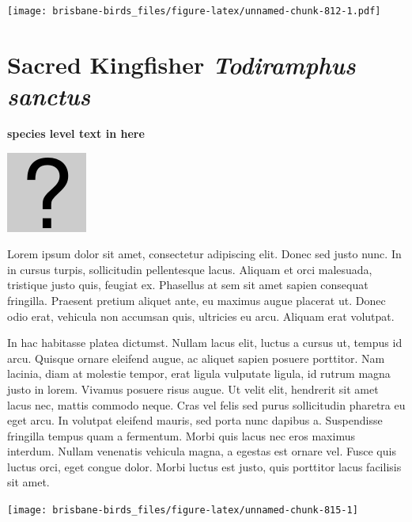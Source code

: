 \documentclass[]{book}
\let\origfigure\figure
\let\endorigfigure\endfigure
\renewenvironment{figure}[1][2] {
  \expandafter\origfigure\expandafter[H]
} {
  \endorigfigure
}
\begin{document}
\begin{figure}
\centering
\texttt{[image: brisbane-birds\_files/figure-latex/unnamed-chunk-812-1.pdf]}
\caption{\label{fig:unnamed-chunk-812}insert figure caption}
\end{figure}

\section{\texorpdfstring{Sacred Kingfisher \emph{Todiramphus
sanctus}}{Sacred Kingfisher Todiramphus sanctus}}\label{sacred-kingfisher-todiramphus-sanctus}

\textbf{species level text in here}

\begin{figure}
\centering
\includegraphics{assets/missing.png}
\caption{No image for species}
\end{figure}

Lorem ipsum dolor sit amet, consectetur adipiscing elit. Donec sed justo
nunc. In in cursus turpis, sollicitudin pellentesque lacus. Aliquam et
orci malesuada, tristique justo quis, feugiat ex. Phasellus at sem sit
amet sapien consequat fringilla. Praesent pretium aliquet ante, eu
maximus augue placerat ut. Donec odio erat, vehicula non accumsan quis,
ultricies eu arcu. Aliquam erat volutpat.

In hac habitasse platea dictumst. Nullam lacus elit, luctus a cursus ut,
tempus id arcu. Quisque ornare eleifend augue, ac aliquet sapien posuere
porttitor. Nam lacinia, diam at molestie tempor, erat ligula vulputate
ligula, id rutrum magna justo in lorem. Vivamus posuere risus augue. Ut
velit elit, hendrerit sit amet lacus nec, mattis commodo neque. Cras vel
felis sed purus sollicitudin pharetra eu eget arcu. In volutpat eleifend
mauris, sed porta nunc dapibus a. Suspendisse fringilla tempus quam a
fermentum. Morbi quis lacus nec eros maximus interdum. Nullam venenatis
vehicula magna, a egestas est ornare vel. Fusce quis luctus orci, eget
congue dolor. Morbi luctus est justo, quis porttitor lacus facilisis sit
amet.

\begin{figure}
\texttt{[image: brisbane-birds\_files/figure-latex/unnamed-chunk-815-1]} \caption{insert figure caption}\label{fig:unnamed-chunk-815}
\end{figure}
\end{document}
